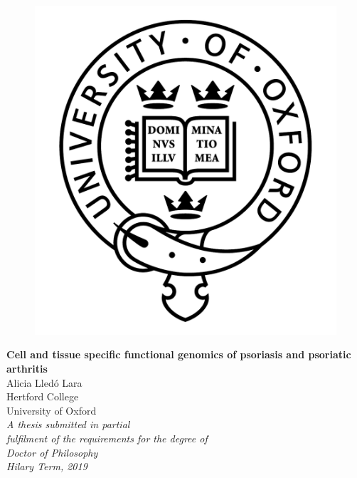 \begin{titlepage}
   \centering
   \begin{figure}
      \centering
      \includegraphics[scale=0.4]{oxford_logo-eps-converted-to.pdf}
   \end{figure}
   {\LARGE{\textbf{Cell and tissue specific functional genomics of psoriasis and psoriatic arthritis}}}\\
    \vspace{2cm}
   {\Large{Alicia Lled\'{o} Lara}}\\
   {\Large{Hertford College}}\\
   {\Large{University of Oxford}}\\
   \vspace{2cm}
   {\Large{\textit{A thesis submitted in partial \\ fulfilment of the requirements for the degree of\\ Doctor of Philosophy}}}\\
   {\Large{\textit{Hilary Term, 2019}}}
\end{titlepage}

